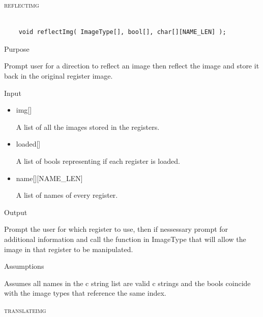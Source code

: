 \documentclass[pdftex, 11pt]{article}
\begin{document}
\begin{description}
\begin{description}
		\end{description}



	\item{\textsc{reflectimg}}

		\begin{lstlisting}

	void reflectImg( ImageType[], bool[], char[][NAME_LEN] );
		\end{lstlisting}

		\begin{description}
			\item{Purpose}

				Prompt user for a direction to reflect an image then reflect the image and
				store it back in the original register image.

			\item{Input}

				\begin{itemize}

					\item{img[]}

						A list of all the images stored in the registers.

					\item{loaded[]}

						A list of bools representing if each register is loaded.

					\item{name[][NAME\_LEN]}

						A list of names of every register.

				\end{itemize}

			\item{Output}

				Prompt the user for which register to use, then if nessessary
				prompt for additional information and call the function
				in ImageType that will allow the image in that register to
				be manipulated.

			\item{Assumptions}

				Assumes all names in the c string list are valid c
				strings and the bools coincide with the image types that
				reference the same index.

		\end{description}



	\item{\textsc{translateimg}}


\end{description}
\end{document}
